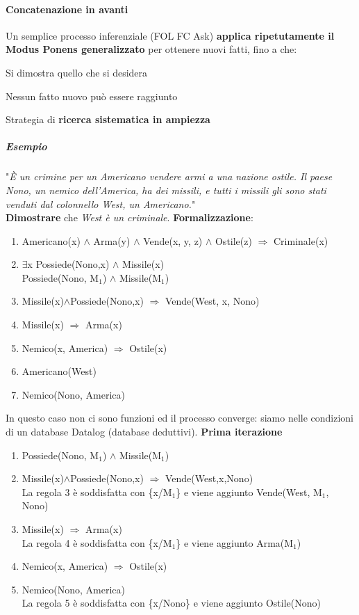 \documentclass[10pt]{book}
\begin{document}
\paragraph{Concatenazione in avanti} Un semplice processo inferenziale (FOL FC Ask) \textbf{applica ripetutamente il Modus Ponens generalizzato} per ottenere nuovi fatti, fino a che:
\begin{list}{}{}
	\item Si dimostra quello che si desidera
	\item Nessun fatto nuovo può essere raggiunto
\end{list}
Strategia di \textbf{ricerca sistematica in ampiezza}
\subparagraph{Esempio}
"\textit{È un crimine per un Americano vendere armi a una nazione ostile. Il
paese Nono, un nemico dell’America, ha dei missili, e tutti i missili gli
sono stati venduti dal colonnello West, un Americano.}"\\
\textbf{Dimostrare} che \textit{West è un criminale}. \textbf{Formalizzazione}:
\begin{enumerate}
	\item Americano(x) $\wedge$ Arma(y) $\wedge$ Vende(x, y, z) $\wedge$ Ostile(z) $\Rightarrow$ Criminale(x)
	\item $\exists$x Possiede(Nono,x) $\wedge$ Missile(x)\\
	Possiede(Nono, M$_1$) $\wedge$ Missile(M$_1$)
	\item Missile(x)$\wedge$Possiede(Nono,x) $\Rightarrow$ Vende(West, x, Nono)
	\item Missile(x) $\Rightarrow$ Arma(x)
	\item Nemico(x, America) $\Rightarrow$ Ostile(x)
	\item Americano(West)
	\item Nemico(Nono, America)
\end{enumerate}
In questo caso non ci sono funzioni ed il processo converge: siamo nelle condizioni di un database Datalog (database deduttivi). \textbf{Prima iterazione}
\begin{enumerate}
	\item Possiede(Nono, M$_1$) $\wedge$ Missile(M$_1$)
	\item Missile(x)$\wedge$Possiede(Nono,x) $\Rightarrow$ Vende(West,x,Nono)\\
	La regola 3 è soddisfatta con \{x/M$_1$\} e viene aggiunto Vende(West, M$_1$, Nono)
	\item Missile(x) $\Rightarrow$ Arma(x)\\
	La regola 4 è soddisfatta con \{x/M$_1$\} e viene aggiunto Arma(M$_1$)
	\item Nemico(x, America) $\Rightarrow$ Ostile(x)
	\item Nemico(Nono, America)\\
	La regola 5 è soddisfatta con \{x/Nono\} e viene aggiunto Ostile(Nono)
\end{enumerate}
\end{document}
